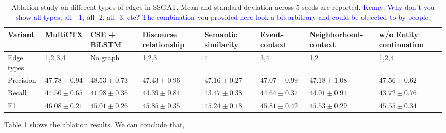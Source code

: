 \documentclass[letterpaper]{article} %
\newcommand{\KZ}[1]{\textcolor{blue}{Kenny: #1}}
\begin{document}
\begin{table}[th]
  \centering \scriptsize
    \begin{tabular}{p{4em}p{5em}p{5em}p{5em}p{5em}p{5em}p{6em}p{5em}}
    \toprule[2pt]
         \textbf{Variant} & \textbf{MultiCTX} & \textbf{CSE + BiLSTM} & \textbf{Discourse relationship } & \textbf{Semantic similarity} & \textbf{Event-context} & \textbf{Neighborhood-context}  &  \textbf{w/o Entity continuation} \\\midrule[1pt]
       Edge types &  1,2,3,4  & No graph & 1,2,3 & 4  & 3,4 &  1,2 & 1,2,4\\\hline
    Precision &    $47.78 \pm 0.94$   &  $48.53 \pm 0.73$ &  $47.43 \pm 0.96$ &    $47.16 \pm 0.27$   &  $47.07\pm 0.99$ &  $47.18 \pm 1.08$     &  $47.56 \pm 0.62$       \\
    \hline
    Recall &   $44.50 \pm 0.65$    &   $41.98\pm 0.36$  & $44.39\pm 0.84$  &    $43.47\pm 0.38$ & $44.64\pm 0.37$  & $44.01\pm 0.91$  &      $43.72\pm 0.76$   \\
    \hline
    F1    &  $46.08\pm0.21$  & $45.01 \pm 0.26 $  &   $45.85\pm0.35$    &  $45.24\pm0.18$        & $45.81\pm0.42 $     & $45.53\pm0.29$   &  $45.55\pm0.34$\\
    \bottomrule[2pt]
    \end{tabular}%
      \caption{Ablation study on different types of edges in SSGAT. Mean and standard deviation across 5 seeds are reported. \KZ{Why don't you show
all types, all - 1, all -2, all -3, etc? The combination you provided here
look a bit arbitrary and could be objected to by people.}}
  \label{tab:ablation}%
\end{table}%


  
Table \ref{tab:ablation} shows the ablation results. We can conclude that, 
\end{document}
